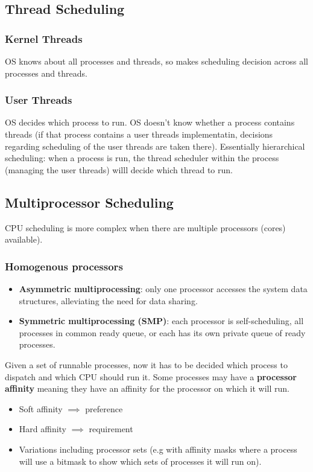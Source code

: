 \documentclass{article}%
\begin{document}
\subsection{Thread Scheduling}
\subsubsection{Kernel Threads}
OS knows about all processes and threads, so makes scheduling decision across all processes and threads.

\subsubsection{User Threads}
OS decides which process to run.
OS doesn't know whether a process contains threads (if that process contains a user threads implementatin, decisions regarding scheduling of the user threads are taken there).
Essentially hierarchical scheduling: when a process is run, the thread scheduler within the process (managing the user threads) willl decide which thread to run.

\subsection{Multiprocessor Scheduling}
CPU scheduling is more complex when there are multiple processors (cores) available).
\subsubsection{Homogenous processors}
\begin{itemize}
	\item \textbf{Asymmetric multiprocessing}: only one processor accesses the system data structures, alleviating the need for data sharing.
	\item \textbf{Symmetric multiprocessing (SMP)}: each processor is self-scheduling, all processes in common ready queue, or each has its own private queue of ready processes.
\end{itemize}
Given a set of runnable processes, now it has to be decided which process to dispatch and which CPU should run it.
Some processes may have a \textbf{processor affinity} meaning they have an affinity for the processor on which it will run.
\begin{itemize}
	\item Soft affinity $\implies$ preference
	\item Hard affinity $\implies$ requirement
	\item Variations including processor sets (e.g with affinity masks where a process will use a bitmask  to show which sets of processes it will run on).
\end{itemize}
\end{document}

